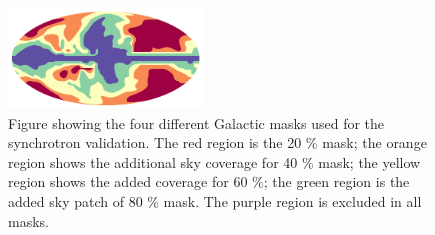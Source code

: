 \documentclass[twocolumn]{aastex631}
\newcommand{\giuse}[1]{\textcolor{orange}{(GP: #1)}}
\begin{document}
\begin{figure}
    \centering
    \includegraphics[width=0.46\textwidth]{figures/SYNC_mask_stack.png}
    \caption{Figure showing the four different Galactic masks used for the synchrotron validation. The red region is the 20 \% mask; the orange region shows the additional sky coverage for 40 \% mask; the yellow region shows the added coverage for 60 \%; the green region is the added sky patch of 80 \% mask. The purple region is excluded in all masks. }
    \label{fig:sync_masks}
\end{figure}

\end{document}
